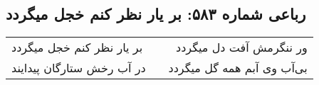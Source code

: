 \begin{center}
\section*{رباعی شماره ۵۸۳: بر یار نظر کنم خجل میگردد}
\label{sec:0583}
\begin{longtable}{l p{0.5cm} r}
بر یار نظر کنم خجل میگردد
&&
ور ننگرمش آفت دل میگردد
\\
در آب رخش ستارگان پیدایند
&&
بی‌آب وی آبم همه گل میگردد
\\
\end{longtable}
\end{center}
